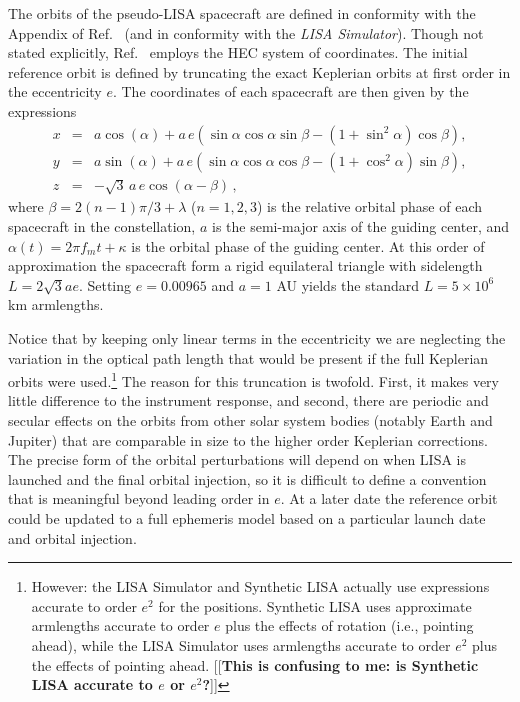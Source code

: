 \documentclass[11pt]{report}
\begin{document}
The orbits of the pseudo-LISA spacecraft are defined in conformity with the Appendix of Ref.~\cite{cr2003}
(and in conformity with the \emph{LISA Simulator}). Though not stated explicitly, Ref.~\cite{cr2003} employs the
HEC system of coordinates. The initial reference orbit is defined by
truncating the exact Keplerian orbits at first order in the eccentricity $e$. The coordinates of each
spacecraft are then given by the expressions
%
\begin{eqnarray}
x &=& a\cos(\alpha) + a \, e\left(\sin\alpha\cos\alpha\sin\beta
-(1+\sin^2\alpha)\cos\beta\right), \nonumber \\
y &=& a\sin(\alpha) + a \, e\left(\sin\alpha\cos\alpha\cos\beta
-(1+\cos^2\alpha)\sin\beta\right), \\
z & = & -\sqrt{3} \, a \, e \cos(\alpha-\beta) \, , \nonumber
\end{eqnarray}
%
where $\beta = 2(n-1)\pi/3 + \lambda$ ($n=1,2,3$) is the relative orbital phase of each spacecraft in the
constellation, $a$ is the semi-major axis of the guiding center, and $\alpha(t)=2\pi f_m t + \kappa$ is
the orbital phase of the guiding center. At this order of approximation the spacecraft form
a rigid equilateral triangle with sidelength $L = 2\sqrt{3} a e$. Setting $e=0.00965$ and $a = 1$ AU yields
the standard $L=5\times 10^6$ km armlengths. 

Notice that by keeping only linear terms in the eccentricity we are neglecting the
variation in the optical path length that would be present if the full Keplerian
orbits were used.\footnote{However: the LISA Simulator and Synthetic LISA actually use expressions
accurate to order $e^2$ for the positions. Synthetic LISA uses approximate armlengths
accurate to order $e$ plus the effects of rotation (i.e., pointing ahead), while the LISA Simulator
uses armlengths accurate to order $e^2$
plus the effects of pointing ahead. [[{\bf This is confusing to me: is Synthetic LISA accurate to $e$ or $e^2$?}]]} 
The reason for this truncation is twofold. First,
it makes very little difference to the instrument response, and second, there are
periodic and secular effects on the orbits from other solar system bodies (notably
Earth and Jupiter) that are comparable in size to the higher order Keplerian corrections.
The precise form of the orbital perturbations will depend on when LISA is launched
and the final orbital injection, so it is difficult to define a convention that is
meaningful beyond leading order in $e$. At a later date the reference orbit could be
updated to a full ephemeris model based on a particular launch date and orbital
injection.
\end{document}

